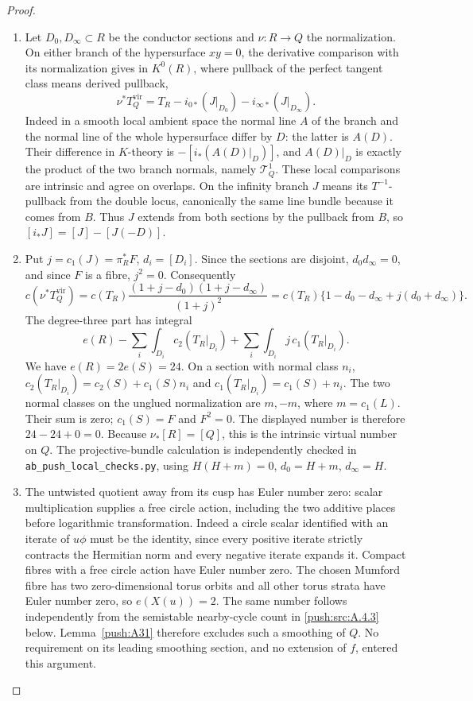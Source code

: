 \begin{proof}
\begin{enumerate}[label=\arabic*.,leftmargin=*]
\item Let $D_0,D_\infty\subset R$ be the conductor sections and
$\nu:R\to Q$ the normalization. On either branch of the
hypersurface $xy=0$, the derivative comparison with its
normalization gives in $K^0(R)$, where pullback of the
perfect tangent class means derived pullback,
\[
 \nu^*T_Q^{\mathrm{vir}}
 =T_R-i_{0*}(J|_{D_0})-i_{\infty*}(J|_{D_\infty}).
\]
Indeed in a smooth local ambient space the normal line $A$ of
the branch and the normal line of the whole hypersurface
differ by $D$: the latter is $A(D)$. Their difference in
$K$-theory is $-[i_*(A(D)|_D)]$, and $A(D)|_D$ is exactly
the product of the two branch normals, namely $\mathcal T^1_Q$.
These local comparisons are intrinsic and agree on overlaps.
On the infinity branch $J$ means its $T^{-1}$-pullback
from the double locus, canonically the same line bundle
because it comes from $B$. Thus $J$ extends from both sections by the pullback from $B$,
so $[i_*J]=[J]-[J(-D)]$.

\item Put $j=c_1(J)=\pi_R^*F$, $d_i=[D_i]$. Since the sections are
disjoint, $d_0d_\infty=0$, and since $F$ is a fibre, $j^2=0$.
Consequently
\[
 c(\nu^*T_Q^{\mathrm{vir}})
 =c(T_R)\frac{(1+j-d_0)(1+j-d_\infty)}{(1+j)^2}
 =c(T_R)\{1-d_0-d_\infty+j(d_0+d_\infty)\}.
\]
The degree-three part has integral
\[
 e(R)-\sum_i\int_{D_i}c_2(T_R|_{D_i})
       +\sum_i\int_{D_i}j\,c_1(T_R|_{D_i}).
\]
We have $e(R)=2e(S)=24$. On a section with normal class
$n_i$, $c_2(T_R|_{D_i})=c_2(S)+c_1(S)n_i$ and
$c_1(T_R|_{D_i})=c_1(S)+n_i$. The two normal classes on
the unglued normalization are $m,-m$, where $m=c_1(L)$.
Their sum is zero; $c_1(S)=F$ and $F^2=0$. The displayed
number is therefore $24-24+0=0$. Because
$\nu_*[R]=[Q]$, this is the intrinsic virtual number on $Q$.
The projective-bundle calculation is independently checked
in \texttt{ab\_push\_local\_checks.py}, using
$H(H+m)=0$, $d_0=H+m$, $d_\infty=H$.

\item The untwisted quotient away from its cusp has Euler number zero:
scalar multiplication supplies a free circle action, including
the two additive places before logarithmic transformation. Indeed
a circle scalar identified with an iterate of $u\phi$ must be
the identity, since every positive iterate strictly contracts
the Hermitian norm and every negative iterate expands it.
Compact fibres with a free circle action have Euler number zero.
The chosen Mumford fibre has two zero-dimensional torus orbits
and all other torus strata have Euler number zero, so
$e(X(u))=2$. The same number follows independently from the
semistable nearby-cycle count in \ref{push:src:A.4.3} below. Lemma~\ref{push:A31}
therefore excludes such a smoothing of $Q$. No requirement
on its leading smoothing section, and no extension of $f$,
entered this argument.


\end{enumerate}
\end{proof}
